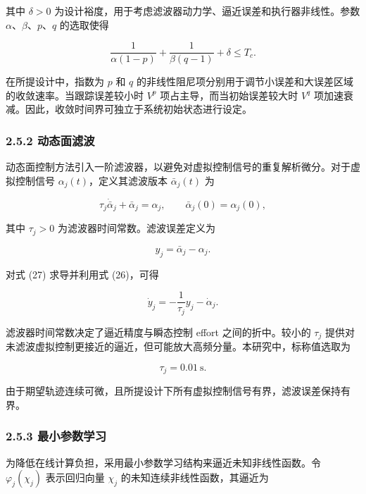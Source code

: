 \documentclass{article}
\begin{document}
其中 $\delta>0$ 为设计裕度，用于考虑滤波器动力学、逼近误差和执行器非线性。参数 $\alpha$、$\beta$、$p$、$q$ 的选取使得

\begin{equation}
\frac{1}{\alpha(1-p)}+\frac{1}{\beta(q-1)}+\delta\leq T_c. \tag{25}
\end{equation}

在所提设计中，指数为 $p$ 和 $q$ 的非线性阻尼项分别用于调节小误差和大误差区域的收敛速率。当跟踪误差较小时 $V^p$ 项占主导，而当初始误差较大时 $V^q$ 项加速衰减。因此，收敛时间界可独立于系统初始状态进行设定。

\subsubsection{2.5.2 动态面滤波}

动态面控制方法引入一阶滤波器，以避免对虚拟控制信号的重复解析微分。对于虚拟控制信号 $\alpha_j(t)$，定义其滤波版本 $\bar\alpha_j(t)$ 为

\begin{equation}
\tau_j\dot{\bar\alpha}_j+\bar\alpha_j=\alpha_j,\qquad \bar\alpha_j(0)=\alpha_j(0), \tag{26}
\end{equation}

其中 $\tau_j>0$ 为滤波器时间常数。滤波误差定义为

\begin{equation}
y_j=\bar\alpha_j-\alpha_j. \tag{27}
\end{equation}

对式 (27) 求导并利用式 (26)，可得

\begin{equation}
\dot y_j=-\frac{1}{\tau_j}y_j-\dot\alpha_j. \tag{28}
\end{equation}

滤波器时间常数决定了逼近精度与瞬态控制 effort 之间的折中。较小的 $\tau_j$ 提供对未滤波虚拟控制更接近的逼近，但可能放大高频分量。本研究中，标称值选取为

\begin{equation*}
\tau_j=0.01~\mathrm{s}.
\end{equation*}

由于期望轨迹连续可微，且所提设计下所有虚拟控制信号有界，滤波误差保持有界。

\subsubsection{2.5.3 最小参数学习}

为降低在线计算负担，采用最小参数学习结构来逼近未知非线性函数。令 $\varphi_j(\chi_j)$ 表示回归向量 $\chi_j$ 的未知连续非线性函数，其逼近为
\end{document}
